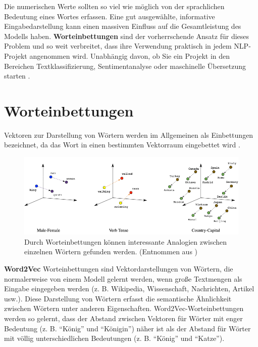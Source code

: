 Die numerischen Werte sollten so viel wie möglich von der sprachlichen Bedeutung eines Wortes erfassen. Eine gut ausgewählte, informative Eingabedarstellung kann einen massiven Einfluss auf die Gesamtleistung des Modells haben. \textbf{Worteinbettungen} sind der vorherrschende Ansatz für dieses Problem und so weit verbreitet, dass ihre Verwendung praktisch in jedem NLP-Projekt angenommen wird. Unabhängig davon, ob Sie ein Projekt in den Bereichen Textklassifizierung, Sentimentanalyse oder maschinelle Übersetzung starten \cite*{Lecun2015}.


\section{Worteinbettungen}
Vektoren zur Darstellung von Wörtern werden im Allgemeinen als Einbettungen bezeichnet, da das Wort in einen bestimmten Vektorraum eingebettet wird \cite*[99]{Jurafskya}.

\begin{figure}[H]
    \centering
    \includegraphics[width=14cm]{kapitel3/wordem.png}
    \caption[Worteinbettungen erzeugen Analogien zwischen Wörtern]{Durch Worteinbettungen können interessante Analogien zwischen einzelnen Wörtern gefunden werden. (Entnommen aus \cite*{wordemdgood})}
    \label{Word2Vex}
\end{figure}


\textbf{Word2Vec} \cite*{Mikolov2013} Worteinbettungen sind Vektordarstellungen von Wörtern, die normalerweise von einem Modell gelernt werden, wenn große Textmengen als Eingabe eingegeben werden (z. B. Wikipedia, Wissenschaft, Nachrichten, Artikel usw.). Diese Darstellung von Wörtern erfasst die semantische Ähnlichkeit zwischen Wörtern unter anderen Eigenschaften. Word2Vec-Worteinbettungen werden so gelernt, dass der Abstand zwischen Vektoren für Wörter mit enger Bedeutung (z. B. \enquote{König} und \enquote{Königin}) näher ist als der Abstand für Wörter mit völlig unterschiedlichen Bedeutungen (z. B. \enquote{König} und \enquote{Katze}).

